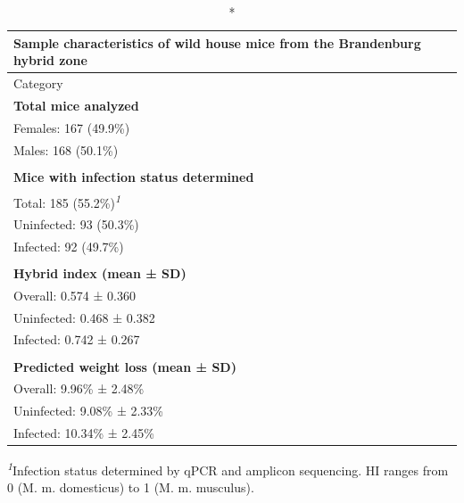 \setlength{\LTpost}{0mm}
\begin{longtable}{l}
\caption*{
{\large Sample characteristics of wild house mice from the Brandenburg hybrid zone}
} \\ 
\toprule
Category \\ 
\midrule\addlinespace[2.5pt]
\textbf{Total mice analyzed} \\ 
Females: 167 (49.9\%) \\ 
Males: 168 (50.1\%) \\ 
 \\ 
\textbf{Mice with infection status determined} \\ 
Total: 185 (55.2\%)\textsuperscript{\textit{1}} \\ 
Uninfected: 93 (50.3\%) \\ 
Infected: 92 (49.7\%) \\ 
 \\ 
\textbf{Hybrid index (mean ± SD)} \\ 
Overall: 0.574 ± 0.360 \\ 
Uninfected: 0.468 ± 0.382 \\ 
Infected: 0.742 ± 0.267 \\ 
 \\ 
\textbf{Predicted weight loss (mean ± SD)} \\ 
Overall: 9.96\% ± 2.48\% \\ 
Uninfected: 9.08\% ± 2.33\% \\ 
Infected: 10.34\% ± 2.45\% \\ 
\bottomrule
\end{longtable}
\begin{minipage}{\linewidth}
\textsuperscript{\textit{1}}Infection status determined by qPCR and amplicon sequencing. HI ranges from 0 (M. m. domesticus) to 1 (M. m. musculus).\\
\end{minipage}

